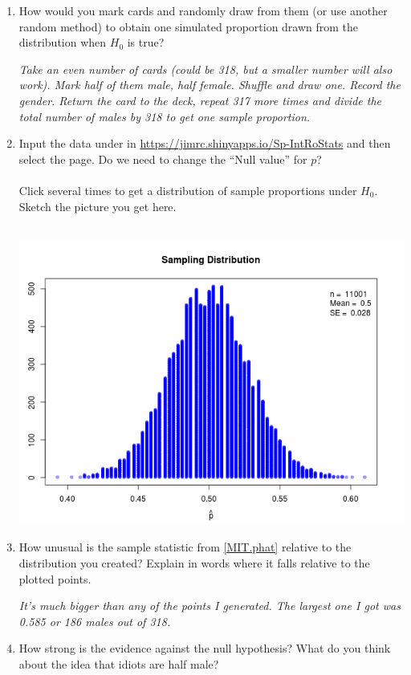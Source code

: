 \begin{enumerate}
\begin{enumerate}
    \item How would you mark cards and randomly draw from them (or use
      another random method) to
      obtain one simulated proportion drawn from the distribution when
      $H_0$ is true?
\begin{students}
    \vspace{3cm}    
\end{students}
\begin{key} 
  {\it Take an even number of cards (could be 318, but a
    smaller number will also work). Mark half of them male, half
    female. Shuffle and draw one. Record the gender. Return the card
    to the deck, repeat 317 more times and divide the total number of
    males by 318 to get one sample proportion.}
\end{key}
    \item Input the data under  in 
      \url{https://jimrc.shinyapps.io/Sp-IntRoStats}
      and then select the   page.  Do we need to change the
      ``Null value'' for $p$?\\ \ \\
      Click  several times to get a distribution of sample
      proportions under $H_0$. 
      Sketch the picture you get here.
\begin{students}
    \vspace{5cm}    
\end{students}
\begin{key}
\ \  \\ \includegraphics[width=.3\linewidth]{../plots/MIT-null.png}
\end{key}
  \item How unusual is the sample statistic from \ref{MIT.phat}
    relative to the distribution you created?  Explain in words where
    it falls relative to the plotted points.
\begin{students}
    \vspace{3cm}    
\end{students}

\begin{key}
{\it It's much bigger than any of the points I generated. The largest
  one I got was 0.585 or 186 males out of 318.}
\end{key} 
\item  How strong is the evidence against the null hypothesis?  What
  do you think about the idea that idiots are half male?
\begin{students}
    \vspace{2cm}    
\end{students}


\end{enumerate}
\end{enumerate}
